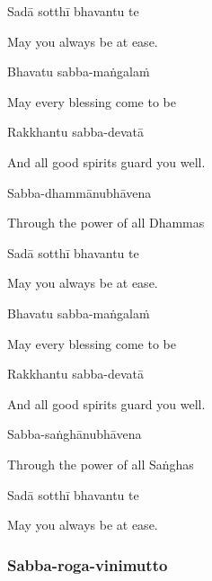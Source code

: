 Sadā sotthī bhavantu te

\begin{cprenglish}
  May you always be at ease.
\end{cprenglish}

Bhavatu sabba-maṅgalaṁ

\begin{cprenglish}
  May every blessing come to be
\end{cprenglish}

Rakkhantu sabba-devatā

\begin{cprenglish}
  And all good spirits guard you well.
\end{cprenglish}

Sabba-dhammānubhāvena

\begin{cprenglish}
  Through the power of all Dhammas
\end{cprenglish}

Sadā sotthī bhavantu te

\begin{cprenglish}
  May you always be at ease.
\end{cprenglish}

Bhavatu sabba-maṅgalaṁ

\begin{cprenglish}
  May every blessing come to be
\end{cprenglish}

Rakkhantu sabba-devatā

\begin{cprenglish}
  And all good spirits guard you well.
\end{cprenglish}

Sabba-saṅghānubhāvena

\begin{cprenglish}
  Through the power of all Saṅghas
\end{cprenglish}

Sadā sotthī bhavantu te

\begin{cprenglish}
  May you always be at ease.
\end{cprenglish}

\subsubsection{Sabba-roga-vinimutto}


